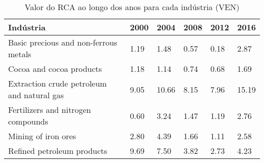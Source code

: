 \begin{table}
\centering
\caption{Valor do RCA ao longo dos anos para cada indústria (VEN)}
\begin{tabular}{p{6cm}p{1.5cm}p{1.5cm}p{1.5cm}p{1.5cm}p{1.5cm}}
\toprule
                                 Indústria & 2000 &  2004 & 2008 & 2012 &  2016 \\
\midrule
     Basic precious and non-ferrous metals & 1.19 &  1.48 & 0.57 & 0.18 &  2.87 \\
                  Cocoa and cocoa products & 1.18 &  1.14 & 0.74 & 0.68 &  1.69 \\
Extraction crude petroleum and natural gas & 9.05 & 10.66 & 8.15 & 7.96 & 15.19 \\
        Fertilizers and nitrogen compounds & 0.60 &  3.24 & 1.47 & 1.19 &  2.76 \\
                       Mining of iron ores & 2.80 &  4.39 & 1.66 & 1.11 &  2.58 \\
                Refined petroleum products & 9.69 &  7.50 & 3.82 & 2.73 &  4.23 \\
\bottomrule
\end{tabular}
\end{table}
